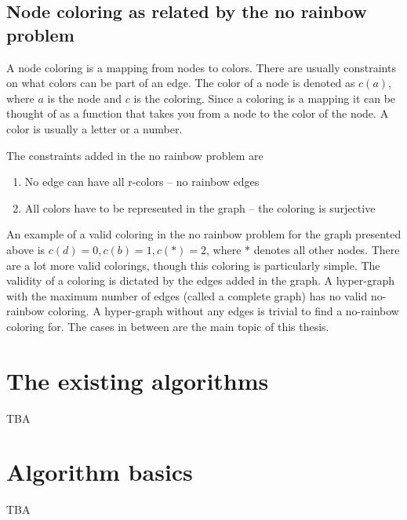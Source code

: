 \documentclass{report}
\begin{document}
\subsection{Node coloring as related by the no rainbow problem}
A node coloring is a mapping from nodes to colors.
There are usually constraints on what colors can be part of an edge.
The color of a node is denoted as $c(a)$, where $a$ is the node and $c$ is the coloring.
Since a coloring is a mapping it can be thought of as a function that takes you from a node to the color of the node.
A color is usually a letter or a number.

The constraints added in the no rainbow problem are
\begin{enumerate}
  \item No edge can have all r-colors -- no rainbow edges
  \item All colors have to be represented in the graph -- the coloring is surjective
\end{enumerate}

An example of a valid coloring in the no rainbow problem for the graph presented above is $c(d)=0, c(b)=1, c(*)=2$, where $*$ denotes all other nodes.
There are a lot more valid colorings, though this coloring is particularly simple.
The validity of a coloring is dictated by the edges added in the graph.
A hyper-graph with the maximum number of edges (called a complete graph) has no valid no-rainbow coloring.
A hyper-graph without any edges is trivial to find a no-rainbow coloring for.
The cases in between are the main topic of this thesis.

\cite{sourceHyper}

\section{The existing algorithms}
TBA

\section{Algorithm basics}
TBA

\printbibliography
\end{document}
